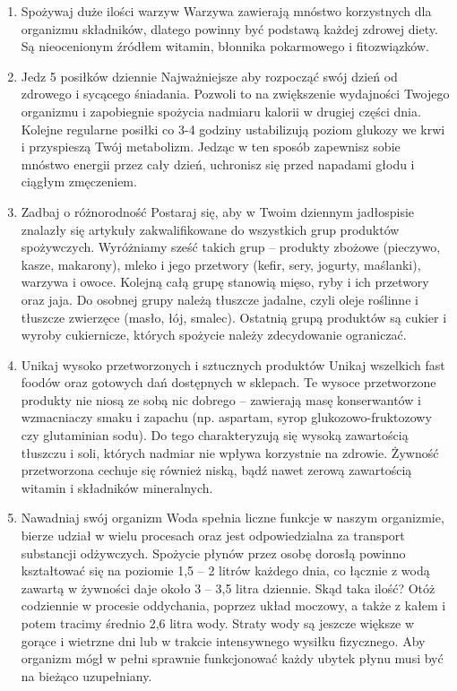 \documentclass{article}
\begin{document}
\begin{enumerate}
\item Spożywaj duże ilości warzyw \newline
Warzywa zawierają mnóstwo korzystnych dla organizmu składników, dlatego powinny być podstawą każdej zdrowej diety. Są nieocenionym źródłem witamin, błonnika pokarmowego i fitozwiązków.
\item Jedz 5 posiłków dziennie \newline
Najważniejsze aby rozpocząć swój dzień od zdrowego i sycącego śniadania. Pozwoli to na zwiększenie wydajności Twojego organizmu i zapobiegnie spożycia nadmiaru kalorii w drugiej części dnia. Kolejne regularne posiłki co 3-4 godziny ustabilizują poziom glukozy we krwi i przyspieszą Twój metabolizm. Jedząc w ten sposób zapewnisz sobie mnóstwo energii przez cały dzień, uchronisz się przed napadami głodu i ciągłym zmęczeniem.
\item Zadbaj o różnorodność \newline
Postaraj się, aby w Twoim dziennym jadłospisie znalazły się artykuły zakwalifikowane do wszystkich grup produktów spożywczych. Wyróżniamy sześć takich grup – produkty zbożowe (pieczywo, kasze, makarony), mleko i jego przetwory (kefir, sery, jogurty, maślanki), warzywa i owoce. Kolejną całą grupę stanowią mięso, ryby i ich przetwory oraz jaja. Do osobnej grupy należą tłuszcze jadalne, czyli oleje roślinne i tłuszcze zwierzęce (masło, łój, smalec). Ostatnią grupą produktów są cukier i wyroby cukiernicze, których spożycie należy zdecydowanie ograniczać.
\item Unikaj wysoko przetworzonych i sztucznych produktów \newline
Unikaj wszelkich fast foodów oraz gotowych dań dostępnych w sklepach. Te wysoce przetworzone produkty nie niosą ze sobą nic dobrego – zawierają masę konserwantów i wzmacniaczy smaku i zapachu (np. aspartam, syrop glukozowo-fruktozowy czy  glutaminian sodu). Do tego charakteryzują się wysoką zawartością tłuszczu i soli, których nadmiar nie wpływa korzystnie na zdrowie. Żywność przetworzona cechuje się również niską, bądź nawet zerową zawartością witamin i składników mineralnych.
\item Nawadniaj swój organizm \newline
Woda spełnia liczne funkcje w naszym organizmie, bierze udział w wielu procesach oraz jest odpowiedzialna za transport substancji odżywczych. Spożycie płynów przez osobę dorosłą powinno kształtować się na poziomie 1,5 – 2 litrów każdego dnia, co łącznie z wodą zawartą w żywności daje około 3 – 3,5 litra dziennie. Skąd taka ilość? Otóż codziennie w procesie oddychania, poprzez układ moczowy, a także z kałem i potem tracimy średnio 2,6 litra wody. Straty wody są jeszcze większe w gorące i wietrzne dni lub w trakcie intensywnego wysiłku fizycznego. Aby organizm mógł w pełni sprawnie funkcjonować każdy ubytek płynu musi być na bieżąco uzupełniany.

\end{enumerate}
\end{document}
